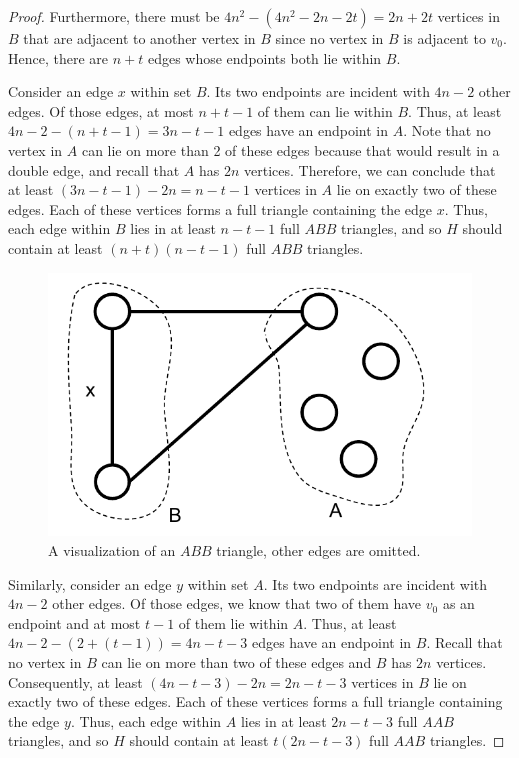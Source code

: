\documentclass[10pt]{amsart}
\begin{document}
\begin{proof}
    Furthermore, there must be $4n^2 - (4n^2 - 2n - 2t) = 2n + 2t$ vertices in $B$ that are adjacent 
    to another vertex in $B$ since no vertex in $B$ is adjacent to $v_0$. Hence, there are 
    $n + t$ edges whose endpoints both lie within $B$.

    Consider an edge $x$ within set $B$. Its two endpoints are incident with $4n - 2$ other edges. 
    Of those edges, at most $n + t - 1$ of them can lie within $B$. Thus, at least 
    $4n - 2 - (n + t - 1) = 3n - t - 1$ edges have an endpoint in $A$. Note that no vertex in 
    $A$ can lie on more than 2 of these edges because that would result in a double edge, and 
    recall that $A$ has $2n$ vertices. Therefore, we can conclude that at least 
    $(3n - t - 1) - 2n = n - t - 1$ vertices in $A$ lie on exactly two of these edges. Each of 
    these vertices forms a full triangle containing the edge $x$.
    Thus, each edge within $B$ lies in at least $n - t - 1$ full $ABB$ triangles, and so $H$ should 
    contain at least $(n + t)(n - t - 1)$ full $ABB$ triangles.

    \begin{figure}[h!]
        \centering
        \includegraphics[scale=.7]{../figures/abb_triangle.pdf}
        \caption{A visualization of an $ABB$ triangle, other edges are omitted.}
    \end{figure}

    Similarly, consider an edge $y$ within set $A$. Its two endpoints are incident with $4n - 2$ other
    edges. Of those edges, we know that two of them have $v_0$ as an endpoint and at most $t - 1$ of 
    them lie within $A$. Thus, at least $4n - 2 - (2 + (t - 1)) = 4n - t - 3$ edges have an endpoint 
    in $B$. Recall that no vertex in $B$ can lie on more than two of these edges and $B$ has $2n$ 
    vertices. Consequently, at least $(4n - t - 3) - 2n = 2n - t - 3$ vertices in $B$ lie on 
    exactly two of these edges. Each of these vertices forms a full triangle containing the edge $y$.
    Thus, each edge within $A$ lies in at least $2n - t - 3$ full $AAB$ triangles, and so $H$ should 
    contain at least $t(2n - t - 3)$ full $AAB$ triangles.


\end{proof}
\end{document}
